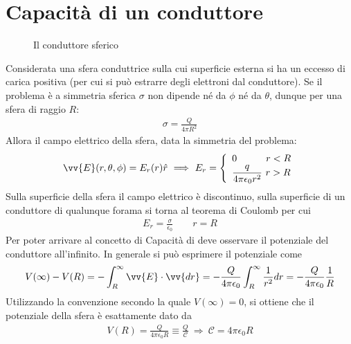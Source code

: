 \documentclass[a4paper, oneside]{article}
\begin{document}
\section{Capacità di un conduttore}
\begin{figure}
    \centering
    \caption{Il conduttore sferico}
\end{figure}
Considerata una sfera conduttrice sulla cui superficie esterna si ha 
un eccesso di carica positiva (per cui si può estrarre degli elettroni 
dal conduttore). Se il problema è a simmetria sferica $\sigma$ non dipende
né da $\phi$ né da $\theta$, dunque per una sfera di raggio $R$: 
\begin{gather*}
    \sigma = \frac{Q}{4\pi R^{2}}
\end{gather*}
Allora il campo elettrico della sfera, data la simmetria del problema:
\begin{gather*}
    \vv{E}(r, \theta, \phi) = E_r(r) \hat{r} \ \Longrightarrow \ E_r = \left\{\begin{array}{l}
        0 \qquad\quad r < R \\
        \dfrac{q}{4\pi\epsilon_0 r^{2}} \ r > R
    \end{array}\right.
\end{gather*}
Sulla superficie della sfera il campo elettrico è discontinuo, sulla superficie di 
un conduttore di qualunque forama si torna al teorema di Coulomb per cui 
\begin{gather*}
    E_r = \frac{\sigma}{\epsilon_0} \qquad r = R
\end{gather*}
Per poter arrivare al concetto di Capacità di deve osservare il potenziale del conduttore 
all'infinito. In generale si può esprimere il potenziale come 
\begin{gather*}
    V(\infty ) - V(R) = -\int_{R}^{\infty } \vv{E} \cdot \vv{dr} = -\frac{Q}{4\pi\epsilon_0} \int_{R}^{\infty } \frac{1}{r^{2}} dr = -\frac{Q}{4\pi\epsilon_0} \frac{1}{R}
\end{gather*}
Utilizzando la convenzione secondo la quale $V(\infty ) = 0$, si ottiene che il potenziale 
della sfera è esattamente dato da
\begin{align}
    V(R) = \frac{Q}{4\pi\epsilon_0 R} \equiv \frac{Q}{\mathcal{C}} \ \Longrightarrow \ \mathcal{C} = 4\pi\epsilon_0 R
\end{align}
\end{document}
